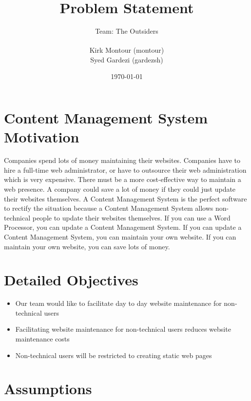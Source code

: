\documentclass[11pt]{article}
\begin{document}
\title{Problem Statement} 
\author{Team: The Outsiders\\ \\ Kirk Montour (montour)\\ Syed Gardezi (gardezsh)}
\date{\today}
  
\maketitle

\pagebreak

\tableofcontents

\pagebreak

\section{Content Management System Motivation}
Companies spend lots of money maintaining their websites. Companies have to hire a full-time web administrator, or have to outsource their web administration which is very expensive. There must be a more cost-effective way to maintain a web presence. A company could save a lot of money if they could just update their websites themselves. A Content Management System is the perfect software to rectify the situation because a Content Management System allows non-technical people to update their websites themselves. If you can use a Word Processor, you can update a Content Management System. If you can update a Content Management System, you can maintain your own website. If you can maintain your own website, you can save lots of money.

\section{Detailed Objectives}

\begin{itemize}
  \item Our team would like to facilitate day to day website maintenance for non-technical users
  \item Facilitating website maintenance for non-technical users reduces website maintenance costs
  \item Non-technical users will be restricted to creating static web pages
\end{itemize}

\section{Assumptions}
\end{document}
